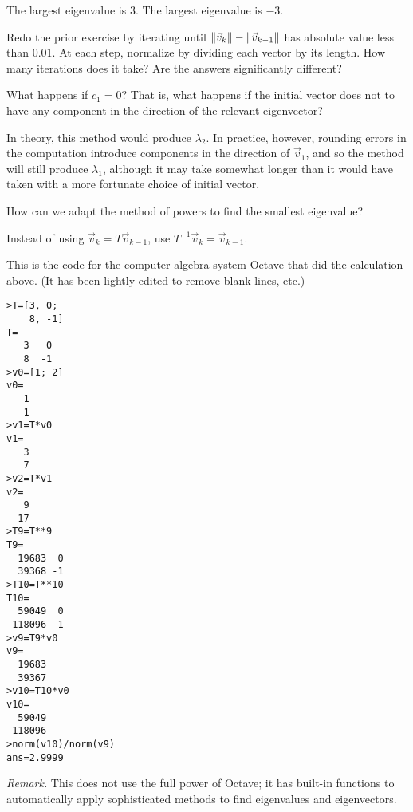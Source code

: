 \begin{exercises}
    \begin{answer}
     \begin{exparts}
       \partsitem The largest eigenvalue is $3$.
       \partsitem The largest eigenvalue is $-3$.
     \end{exparts}
    \end{answer}
  \item 
     Redo the prior exercise by iterating until 
     $\lVert\vec{v}_k\rVert-\lVert\vec{v}_{k-1}\rVert$ has absolute value less than
     $0.01$.
     At each step, normalize by dividing each vector by its length.
     How many iterations does it take?
     Are the answers significantly different?
  \item 
      What happens if $c_1=0$?
      That is, what happens if the initial vector does not to have any 
      component in the direction of the relevant eigenvector?
     \begin{answer}
       In theory, this method would produce $\lambda_2$.
       In practice, however, rounding errors in the computation introduce
       components in the direction of $\vec{v}_1$, and so the method will
       still produce $\lambda_1$, although it may take somewhat longer than
       it would have taken with a more fortunate choice of initial vector. 
     \end{answer}
  \item 
    How can we adapt the method of powers
    to find the smallest eigenvalue?
    \begin{answer}
      Instead of using $\vec{v}_k=T\vec{v}_{k-1}$, 
      use $T^{-1}\vec{v}_k=\vec{v}_{k-1}$.
    \end{answer}
\end{exercises}

\announcecomputercode
This is the code for the computer algebra system Octave that did
the calculation above.
(It has been lightly edited to remove blank lines, etc.)
\begin{lstlisting}
>T=[3, 0;
    8, -1]
T=
   3   0
   8  -1
>v0=[1; 2]
v0=
   1
   1
>v1=T*v0
v1=
   3
   7
>v2=T*v1
v2=
   9
  17
>T9=T**9
T9=
  19683  0
  39368 -1
>T10=T**10
T10=
  59049  0
 118096  1
>v9=T9*v0
v9=
  19683
  39367
>v10=T10*v0
v10=
  59049
 118096
>norm(v10)/norm(v9)
ans=2.9999
\end{lstlisting}
\textit{Remark.}
This does not use the full power of Octave;
it has built-in functions to automatically
apply sophisticated methods to find eigenvalues and eigenvectors.

\endinput





